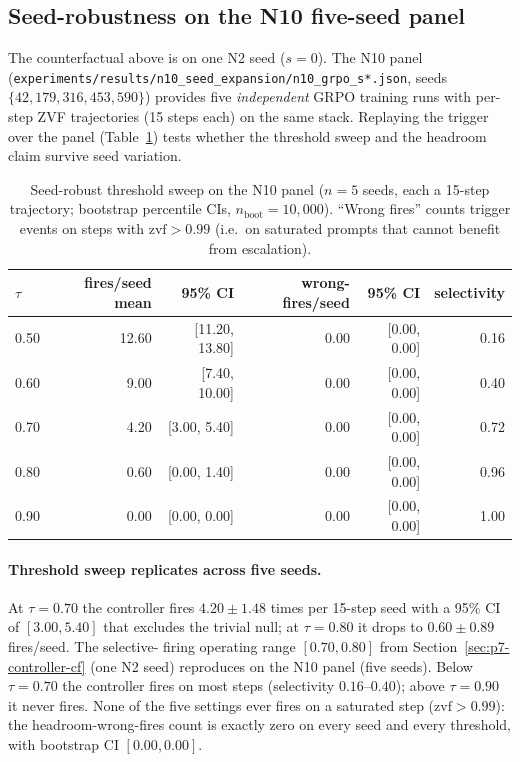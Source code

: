 \subsection{Seed-robustness on the N10 five-seed panel}
\label{sec:p7-controller-seedrobust}
The counterfactual above is on one N2 seed ($s{=}0$). The N10 panel
(\texttt{experiments/results/n10\_seed\_expansion/n10\_grpo\_s*.json},
seeds $\{42, 179, 316, 453, 590\}$) provides five \emph{independent}
GRPO training runs with per-step ZVF trajectories (15 steps each) on
the same stack. Replaying the trigger over the panel
(Table~\ref{tab:p7-seed-robust}) tests whether the threshold sweep and
the headroom claim survive seed variation.

\begin{table}[t]
\centering
\caption{Seed-robust threshold sweep on the N10 panel ($n{=}5$ seeds,
each a 15-step trajectory; bootstrap percentile CIs, $n_{\text{boot}}{=}10{,}000$).
``Wrong fires'' counts trigger events on steps with $\mathrm{zvf} > 0.99$
(i.e.\ on saturated prompts that cannot benefit from escalation).}
\label{tab:p7-seed-robust}
\begin{tabular}{lrrrrr}
\toprule
$\tau$ & fires/seed mean & 95\% CI & wrong-fires/seed & 95\% CI & selectivity \\
\midrule
0.50 & 12.60 & [11.20, 13.80] & 0.00 & [0.00, 0.00] & 0.16 \\
0.60 &  9.00 &  [7.40, 10.00] & 0.00 & [0.00, 0.00] & 0.40 \\
0.70 &  4.20 &  [3.00,  5.40] & 0.00 & [0.00, 0.00] & 0.72 \\
0.80 &  0.60 &  [0.00,  1.40] & 0.00 & [0.00, 0.00] & 0.96 \\
0.90 &  0.00 &  [0.00,  0.00] & 0.00 & [0.00, 0.00] & 1.00 \\
\bottomrule
\end{tabular}
\end{table}

\paragraph{Threshold sweep replicates across five seeds.}
At $\tau{=}0.70$ the controller fires $4.20 \pm 1.48$ times per 15-step
seed with a 95\% CI of $[3.00, 5.40]$ that excludes the trivial null;
at $\tau{=}0.80$ it drops to $0.60 \pm 0.89$ fires/seed. The selective-
firing operating range $[0.70, 0.80]$ from Section~\ref{sec:p7-controller-cf}
(one N2 seed) reproduces on the N10 panel (five seeds). Below $\tau{=}0.70$
the controller fires on most steps (selectivity $0.16$--$0.40$); above
$\tau{=}0.90$ it never fires. None of the five settings ever fires on a
saturated step ($\mathrm{zvf} > 0.99$): the headroom-wrong-fires count is
exactly zero on every seed and every threshold, with bootstrap CI
$[0.00, 0.00]$.


